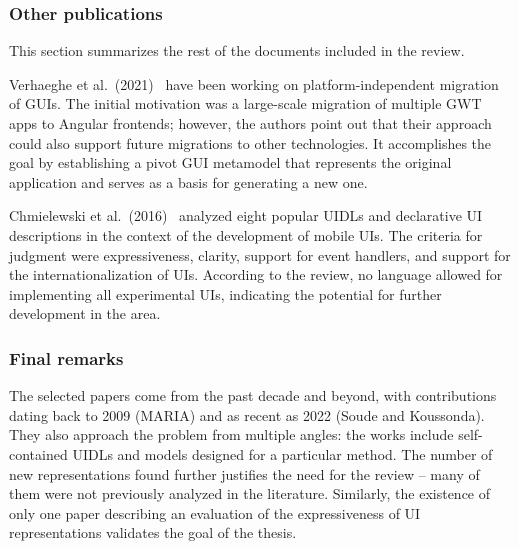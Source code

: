 \subsubsection{Other publications}

This section summarizes the rest of the documents included in the review.

Verhaeghe et al.\ (2021)~\cite{Verhaeghe2021visual, Verhaeghe2021behavior} have been working on platform-independent migration of GUIs.
The initial motivation was a large-scale migration of multiple GWT apps to Angular frontends;
however, the authors point out that their approach could also support future migrations to other technologies.
It accomplishes the goal by establishing a pivot GUI metamodel that represents the original application and serves as a basis for generating a new one.

Chmielewski et al.\ (2016)~\cite{Chmielewski2016} analyzed eight popular UIDLs and declarative UI descriptions in the context of the development of mobile UIs.
The criteria for judgment were expressiveness, clarity, support for event handlers, and support for the internationalization of UIs.
According to the review, no language allowed for implementing all experimental UIs, indicating the potential for further development in the area.

\subsubsection{Final remarks}

The selected papers come from the past decade and beyond, with contributions dating back to 2009 (MARIA) and as recent as 2022 (Soude and Koussonda).
They also approach the problem from multiple angles: the works include self-contained UIDLs and models designed for a particular method.
The number of new representations found further justifies the need for the review -- many of them were not previously analyzed in the literature.
Similarly, the existence of only one paper describing an evaluation of the expressiveness of UI representations validates the goal of the thesis.
